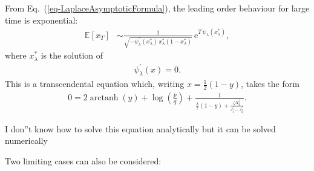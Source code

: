 \documentclass[11pt]{article}
\DeclareMathOperator\arctanh{arctanh}
\begin{document}
From Eq.~(\ref{eq-LaplaceAsymptoticFormula}), the leading order behaviour for large time is exponential:
\begin{align}
  \label{eq-EV-eta-4}  \mathbb{E}\left[x_T \right] & \sim  \frac{1}{\sqrt{-\psi_\lambda^{\prime\prime}(x_\lambda^*)\,x_\lambda^*(1-x_\lambda^*)}}\,\mathrm{e}^{T \,\psi_\lambda(x_\lambda^*)},
\end{align}
where $x_\lambda^*$ is the solution of 
\begin{align*}
\psi_\lambda^\prime(x)  = 0.
\end{align*}
This is a transcendental equation which, writing $x = \frac{1}{2}(1- y)$, takes the form
\begin{align}
\label{eq-critical-point}
0=2 \arctanh(y) + \log\left(\frac{p}{q}\right) + \frac{1}{\frac{\lambda}{2} \left(1 - y \right) + \frac{\zeta X_0^\zeta}{z_1^\zeta - z_2^\zeta}}.
\end{align}

I don''t know how to solve this equation analytically but it can be solved numerically


Two limiting cases can also be considered:
\end{document}
